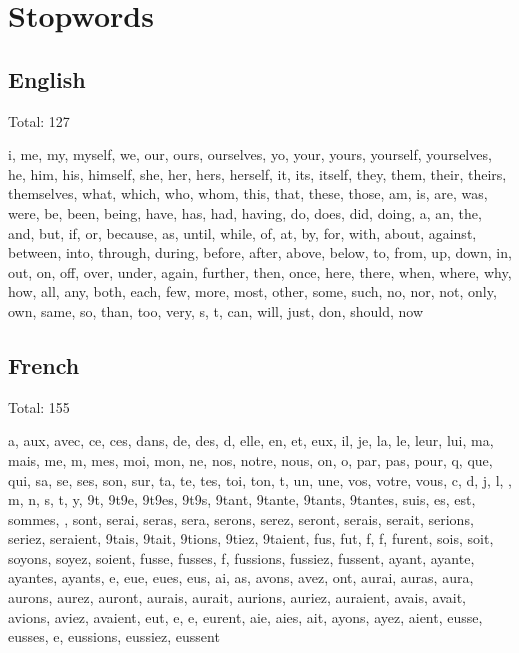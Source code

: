 
\chapter{Stopwords}
\label{app:stopwords}


\section{English}
 
Total: 127

i, me, my, myself, we, our, ours, ourselves, yo, your, yours, yourself, yourselves, he, him, his, himself, she, her, hers, herself, it, its, itself, they, them, their, theirs, themselves, what, which, who, whom, this, that, these, those, am, is, are, was, were, be, been, being, have, has, had, having, do, does, did, doing, a, an, the, and, but, if, or, because, as, until, while, of, at, by, for, with, about, against, between, into, through, during, before, after, above, below, to, from, up, down, in, out, on, off, over, under, again, further, then, once, here, there, when, where, why, how, all, any, both, each, few, more, most, other, some, such, no, nor, not, only, own, same, so, than, too, very, s, t, can, will, just, don, should, now


\section{French}

Total: 155

a, aux, avec, ce, ces, dans, de, des, d, elle, en, et, eux, il, je, la, le, leur, lui, ma, mais, me, m\xeame, mes, moi, mon, ne, nos, notre, nous, on, o, par, pas, pour, q, que, qui, sa, se, ses, son, sur, ta, te, tes, toi, ton, t, un, une, vos, votre, vous, c, d, j, l, , m, n, s, t, y, \xe9t, \xe9t\xe9e, \xe9t\xe9es, \xe9t\xe9s, \xe9tant, \xe9tante, \xe9tants, \xe9tantes, suis, es, est, sommes, \xeates, sont, serai, seras, sera, serons, serez, seront, serais, serait, serions, seriez, seraient, \xe9tais, \xe9tait, \xe9tions, \xe9tiez, \xe9taient, fus, fut, f\xfbmes, f\xfbtes, furent, sois, soit, soyons, soyez, soient, fusse, fusses, f\xfbt, fussions, fussiez, fussent, ayant, ayante, ayantes, ayants, e, eue, eues, eus, ai, as, avons, avez, ont, aurai, auras, aura, aurons, aurez, auront, aurais, aurait, aurions, auriez, auraient, avais, avait, avions, aviez, avaient, eut, e\xfbmes, e\xfbtes, eurent, aie, aies, ait, ayons, ayez, aient, eusse, eusses, e\xfbt, eussions, eussiez, eussent


